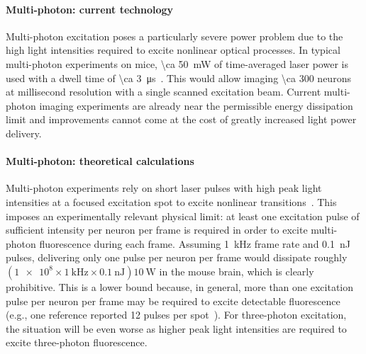 \paragraph{Multi-photon: current technology}
Multi-photon excitation poses a particularly severe power problem due to the high light intensities required to excite nonlinear optical processes.
In typical multi-photon experiments on mice, \SI{\ca 50}{\milli\watt} of time-averaged laser power is used with a dwell time of \SI{\ca 3}{\micro\second}~\cite{wilson07}.
This would allow imaging \num{\ca 300} neurons at millisecond resolution with a single scanned excitation beam.
Current multi-photon imaging experiments are already near the permissible energy dissipation limit and improvements cannot come at the cost of greatly increased light power delivery.

\paragraph{Multi-photon: theoretical calculations}
Multi-photon experiments rely on short laser pulses with high peak light intensities at a focused excitation spot to excite nonlinear transitions~\cite{kim99}.
This imposes an experimentally relevant physical limit: at least one excitation pulse of sufficient intensity per neuron per frame is required in order to excite multi-photon fluorescence during each frame.
Assuming \SI{1}{\kilo\hertz} frame rate and \SI{0.1}{\nano\joule} pulses, delivering only one pulse per neuron per frame would dissipate roughly $\left(\num{1e8}\times\SI{1}{\kilo\hertz}\times\SI{0.1}{\nano\joule}\right) \SI{10}{\watt}$ in the mouse brain, which is clearly prohibitive.
This is a lower bound because, in general, more than one excitation pulse per neuron per frame may be required to excite detectable fluorescence (e.g., one reference reported 12 pulses per spot~\cite{kim99}).
For three-photon excitation, the situation will be even worse as higher peak light intensities are required to excite three-photon fluorescence.

